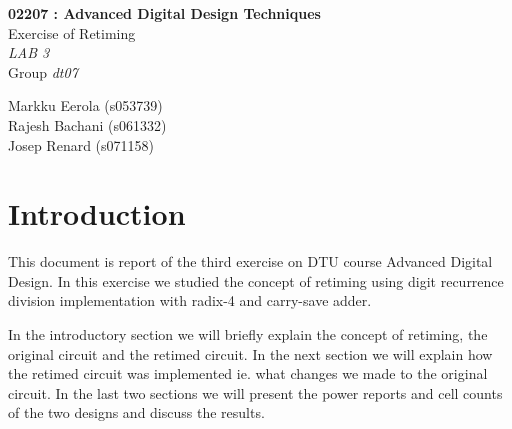 \documentclass[11pt,a4paper]{article}
\begin{document}
	

\begin{titlepage}

\thispagestyle{fancy}
\lhead{}
\rhead{}
\rule{0pt}{50pt}
\vspace{3cm}

\begin{center}

 	\huge{\textbf{02207 : Advanced Digital Design Techniques}}\\
 	\vspace{1cm}
 	\huge{Exercise of Retiming}\\
 	\vspace{1cm}
 	\huge{\textit{LAB 3}}\\
 	\vspace{1cm}
 	\huge{Group \textit{dt07}}\\
\end{center}

\vspace{4cm}

\begin{flushright}
	\LARGE{Markku Eerola (s053739)}\\
	\vspace{0.3cm}
	\LARGE{Rajesh Bachani (s061332)}\\
	\vspace{0.3cm}
	\LARGE{Josep Renard (s071158)}\\
\end{flushright}
\cfoot{\today}
\end{titlepage}


\newpage 
\tableofcontents

\newpage 
\section{Introduction}
This document is report of the third exercise on DTU course Advanced Digital Design. In this exercise we studied the concept of retiming using digit recurrence division implementation with radix-4 and carry-save adder.

In the introductory section we will briefly explain the concept of retiming, the original circuit and the retimed circuit. In the next section we will explain how the retimed circuit was implemented ie. what changes we made to the original circuit. In the last two sections we will present the power reports and cell counts of the two designs and discuss the results.
\end{document}
